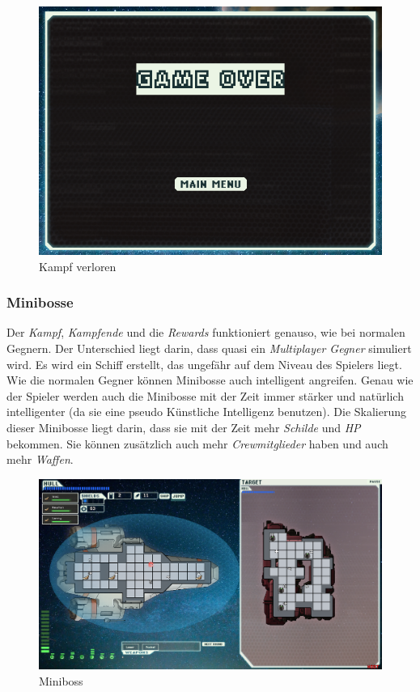 \documentclass[fontsize=12pt,paper=a4,twoside]{scrartcl}
\begin{document}
\begin{figure}[H]
\centering
\includegraphics[width=1\linewidth]{DasSpiel/Kampf/fightlose.png}
\caption{Kampf verloren}
\end{figure}

\subsubsection{Minibosse}

Der \textit{Kampf}, \textit{Kampfende} und die \textit{Rewards} funktioniert genauso, wie bei normalen Gegnern. Der Unterschied liegt darin, dass quasi ein \textit{Multiplayer Gegner} simuliert wird. Es wird ein Schiff erstellt, das ungefähr auf dem Niveau des Spielers liegt. Wie die normalen Gegner können Minibosse auch intelligent angreifen. Genau wie der Spieler werden auch die Minibosse mit der Zeit immer stärker und natürlich intelligenter (da sie eine pseudo Künstliche Intelligenz benutzen). Die Skalierung dieser Minibosse liegt darin, dass sie mit der Zeit mehr \textit{Schilde} und \textit{HP} bekommen. Sie können zusätzlich auch mehr \textit{Crewmitglieder} haben und auch mehr \textit{Waffen}. 

\begin{figure}[H]
\centering
\includegraphics[width=1\linewidth]{DasSpiel/Kampf/miniboss.png}
\caption{Miniboss}
\end{figure}
\end{document}
